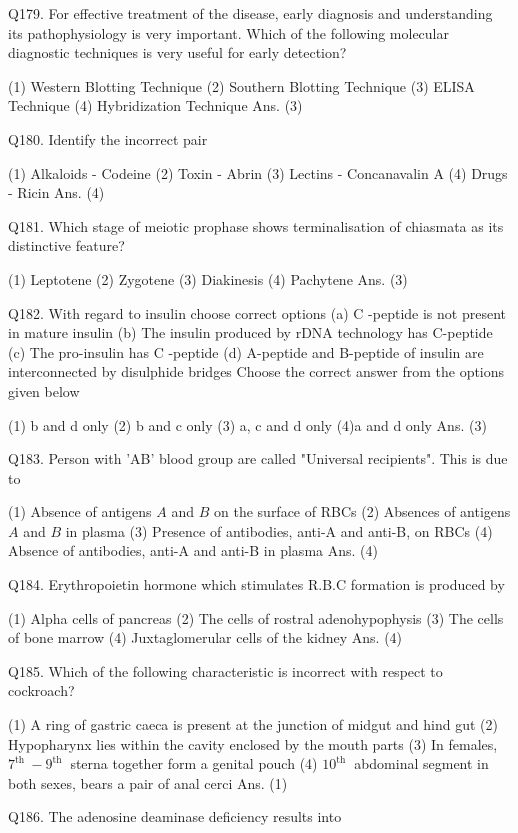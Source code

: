\begin{enumerate}
Q179. For effective treatment of the disease, early diagnosis and understanding its pathophysiology is very important. Which of the following molecular diagnostic techniques is very useful for early detection?

(1) Western Blotting Technique
(2) Southern Blotting Technique
(3) ELISA Technique
(4) Hybridization Technique
Ans. (3)

Q180. Identify the incorrect pair

(1) Alkaloids - Codeine
(2) Toxin - Abrin
(3) Lectins - Concanavalin A
(4) Drugs - Ricin
Ans. (4)

Q181. Which stage of meiotic prophase shows terminalisation of chiasmata as its distinctive feature?

(1) Leptotene
(2) Zygotene
(3) Diakinesis
(4) Pachytene
Ans. (3)

Q182. With regard to insulin choose correct options
(a) C -peptide is not present in mature insulin
(b) The insulin produced by rDNA technology has C-peptide
(c) The pro-insulin has C -peptide
(d) A-peptide and B-peptide of insulin are interconnected by disulphide bridges
Choose the correct answer from the options given below

(1) b and d only
(2) b and c only
(3) a, c and d only
(4)a and d only
Ans. (3)

Q183. Person with 'AB' blood group are called "Universal recipients". This is due to

(1) Absence of antigens $A$ and $B$ on the surface of RBCs
(2) Absences of antigens $A$ and $B$ in plasma
(3) Presence of antibodies, anti-A and anti-B, on RBCs
(4) Absence of antibodies, anti-A and anti-B in plasma
Ans. (4)

Q184. Erythropoietin hormone which stimulates R.B.C formation is produced by

(1) Alpha cells of pancreas
(2) The cells of rostral adenohypophysis
(3) The cells of bone marrow
(4) Juxtaglomerular cells of the kidney
Ans. (4)

Q185. Which of the following characteristic is incorrect with respect to cockroach?

(1) A ring of gastric caeca is present at the junction of midgut and hind gut
(2) Hypopharynx lies within the cavity enclosed by the mouth parts
(3) In females, $7^{\text {th }}-9^{\text {th }}$ sterna together form a genital pouch
(4) $10^{\text {th }}$ abdominal segment in both sexes, bears a pair of anal cerci
Ans. (1)

Q186. The adenosine deaminase deficiency results into


\end{enumerate}
